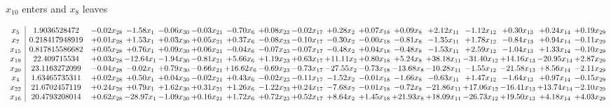 \documentclass[9pt]{article}
\begin{document}
 $ x_{10} $ enters and $ x_{8} $ leaves 

 \[\begin{array}{c| c c@{\hskip 2pt} c@{\hskip 2pt} c@{\hskip 2pt} c@{\hskip 2pt} c@{\hskip 2pt} c@{\hskip 2pt} c@{\hskip 2pt} c@{\hskip 2pt} c@{\hskip 2pt} c@{\hskip 2pt} c@{\hskip 2pt} c@{\hskip 2pt} c@{\hskip 2pt} c@{\hskip 2pt} c@{\hskip 2pt} }
 x_{5}   &  1.9036528472 & -0.02 x_{28} & -1.58 x_{1} & -0.06 x_{30} & -0.03 x_{21} & -0.70 x_{6} & +  0.08 x_{23} & -0.02 x_{17} & +  0.28 x_{2} & +  0.07 x_{18} & +  0.09 x_{8} & +  2.12 x_{11} & -1.12 x_{12} & +  0.30 x_{13} & +  0.24 x_{14} & +  0.19 x_{29}\\
 x_{7}   &  0.218417948919 & +  0.01 x_{28} & +  1.53 x_{1} & +  0.03 x_{30} & +  0.05 x_{21} & +  0.37 x_{6} & -0.08 x_{23} & -0.10 x_{17} & -0.30 x_{2} & -0.00 x_{18} & -0.81 x_{8} & -1.35 x_{11} & +  1.78 x_{12} & -0.84 x_{13} & +  0.94 x_{14} & -0.11 x_{29}\\
 x_{15}   &  0.817815586682 & +  0.05 x_{28} & +  0.76 x_{1} & +  0.09 x_{30} & +  0.06 x_{21} & -0.04 x_{6} & -0.07 x_{23} & -0.07 x_{17} & -0.48 x_{2} & +  0.04 x_{18} & -0.48 x_{8} & -1.53 x_{11} & +  2.59 x_{12} & -1.04 x_{13} & +  1.33 x_{14} & -0.10 x_{29}\\
 x_{19}   &  22.409715534 & +  0.03 x_{28} & -12.64 x_{1} & -1.94 x_{30} & -0.81 x_{21} & +  5.66 x_{6} & +  1.19 x_{23} & +  0.63 x_{17} & + 11.11 x_{2} & +  0.80 x_{18} & +  5.24 x_{8} & + 38.18 x_{11} & -31.40 x_{12} & + 14.16 x_{13} & -20.95 x_{14} & +  2.87 x_{29}\\
 x_{20}   &  23.1163272099 & -0.04 x_{28} & -0.02 x_{1} & +  0.79 x_{30} & -0.66 x_{21} & + 16.62 x_{6} & -0.69 x_{23} & -0.73 x_{17} & -27.55 x_{2} & -0.73 x_{18} & -13.68 x_{8} & -10.28 x_{11} & -1.55 x_{12} & -21.58 x_{13} & +  8.56 x_{14} & -2.11 x_{29}\\
 x_{4}   &  1.63465735311 & +  0.02 x_{28} & +  0.50 x_{1} & +  0.04 x_{30} & -0.02 x_{21} & +  0.43 x_{6} & -0.02 x_{23} & -0.11 x_{17} & -1.52 x_{2} & -0.01 x_{18} & -1.66 x_{8} & -0.63 x_{11} & +  1.47 x_{12} & -1.64 x_{13} & +  0.97 x_{14} & -0.15 x_{29}\\
 x_{22}   &  21.6702457119 & +  0.24 x_{28} & +  0.79 x_{1} & +  1.62 x_{30} & +  0.31 x_{21} & +  1.26 x_{6} & -1.22 x_{23} & +  0.24 x_{17} & -7.68 x_{2} & -0.01 x_{18} & -0.72 x_{8} & -21.86 x_{11} & + 17.06 x_{12} & -16.41 x_{13} & + 13.74 x_{14} & -2.10 x_{29}\\
 x_{16}   &  20.4793208014 & +  0.62 x_{28} & -28.97 x_{1} & -1.09 x_{30} & +  0.16 x_{21} & +  1.72 x_{6} & +  0.72 x_{23} & +  0.52 x_{17} & +  8.64 x_{2} & +  1.45 x_{18} & + 21.93 x_{8} & + 18.09 x_{11} & -26.73 x_{12} & + 19.50 x_{13} & +  4.18 x_{14} & +  4.03 x_{29}\\

\end{array}\]
\end{document}
